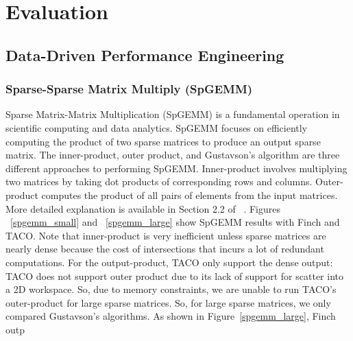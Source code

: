 
\section{Evaluation}

\subsection{Data-Driven Performance Engineering}
\subsubsection{Sparse-Sparse Matrix Multiply (SpGEMM)}

Sparse Matrix-Matrix Multiplication (SpGEMM) is a fundamental operation in scientific computing and data analytics. SpGEMM focuses on efficiently computing the product of two sparse matrices to produce an output sparse matrix.
The inner-product, outer product, and Gustavson's algorithm are three different approaches to performing SpGEMM. 
Inner-product involves multiplying two matrices by taking dot products of corresponding rows and columns.
Outer-product computes the product of all pairs of elements from the input matrices.
More detailed explanation is available in Section 2.2 of ~\cite{zhang2021gamma}.
Figures ~\ref{spgemm_small} and ~\ref{spgemm_large} show SpGEMM results with Finch and TACO.
Note that inner-product is very inefficient unless sparse matrices are nearly dense because the cost of intersections that incurs a lot of redundant computations. For the output-product, TACO only support the dense output: TACO does not support outer product due to its lack of support for scatter into a 2D workspace. So, due to memory constraints, we are unable to run TACO's outer-product for large sparse matrices. So, for large sparse matrices, we only compared Gustavson's algorithms. 
As shown in Figure~\ref{spgemm_large}, Finch outp







